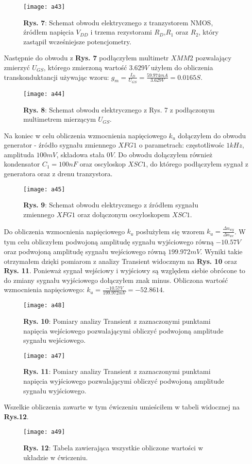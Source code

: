 \documentclass[11pt]{article}
\begin{document}
\begin{figure}[H]
\centering
\texttt{[image: a43]}
\caption*{\textbf{Rys. 7}: Schemat obwodu elektrycznego z tranzystorem NMOS, źródłem napięcia $V_{DD}$ i trzema rezystorami $R_D$,$R_1$ oraz $R_2$, który zastąpił wcześniejsze potencjometry. }
\end{figure}
\noindent Następnie do obwodu z \textbf{Rys. 7} podłączyłem multimetr $XMM2$ pozwalający zmierzyć $U_{GS}$, którego zmierzoną wartość $3.629V$ użyłem do obliczenia transkonduktancji używając wzoru: $g_m = \frac{I_D}{U_{GS}}=
\frac{59.974mA}{3.629V} = 0.0165S$.
\begin{figure}[H]
\centering
\texttt{[image: a44]}
\caption*{\textbf{Rys. 8}: Schemat obwodu elektrycznego z Rys. 7 z podłączonym multimetrem mierzącym $U_{GS}$. }
\end{figure}
\noindent Na koniec w celu obliczenia wzmocnienia napięciowego $k_u$ dołączyłem do obwodu generator - źródło sygnału zmiennego $XFG1$ o parametrach: częstotliwośc $1kHz$, amplituda $100mV$, składowa stała $0V$. Do obwodu dołączyłem również kondensator $C_1 = 100nF$ oraz oscyloskop $XSC1$, do którego podłączyłem sygnał z generatora oraz z drenu tranzystora.
\begin{figure}[H]
\centering
\texttt{[image: a45]}
\caption*{\textbf{Rys. 9}: Schemat obwodu elektrycznego z źródłem sygnału zmiennego $XFG1$ oraz dołączonym oscyloskopem $XSC1$. }
\end{figure}
\noindent Do obliczenia wzmocnienia napięciowego $k_u$ posłużyłem się wzorem $k_u = \frac{{\Delta}u_{wy}}{{\Delta}u_{we}}$. W tym celu obliczyłem podwojoną amplitudę sygnału wyjściowego równą $-10.57V$ oraz podwojoną amplitudę sygnału wejściowego równą $199.972mV$. Wyniki takie otrzymałem dzięki pomiarom z analizy Transient widocznym na \textbf{Rys. 10} oraz \textbf{Rys. 11}. Ponieważ sygnał wejściowy i wyjściowy są względem siebie obrócone to do zmiany sygnału wyjściowego dołączyłem znak minus. Obliczona wartość wzmocnienia napięciowego: $k_u = \frac{-10.57V}{199.972mV} = -52.8614$.
\begin{figure}[H]
\centering
\texttt{[image: a48]}
\caption*{\textbf{Rys. 10}: Pomiary analizy Transient z zaznaczonymi punktami napięcia wejściowego pozwalającymi obliczyć podwojoną amplitude sygnału wejściowego. }
\end{figure}
\begin{figure}[H]
\centering
\texttt{[image: a47]}
\caption*{\textbf{Rys. 11}: Pomiary analizy Transient z zaznaczonymi punktami napięcia wyjściowego pozwalającymi obliczyć podwojoną amplitude sygnału wyjściowego.  }
\end{figure}
\noindent Wszelkie obliczenia zawarte w tym ćwiczeniu umieściłem w tabeli widocznej na \textbf{Rys.12}.
\begin{figure}[H]
\centering
\texttt{[image: a49]}
\caption*{\textbf{Rys. 12}: Tabela zawierająca wszystkie obliczone wartości w układzie w ćwiczeniu. }
\end{figure}
\end{document}
